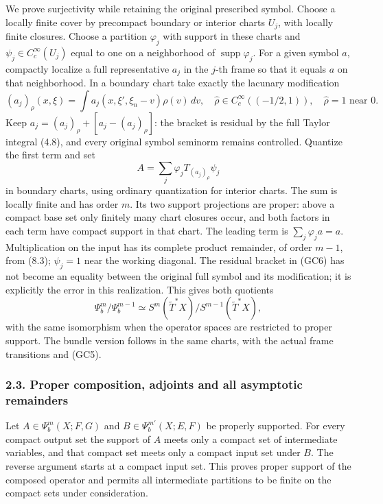\documentclass[
  11pt,
]{article}
\begin{document}
We prove surjectivity while retaining the original prescribed symbol.
Choose a locally finite cover by precompact boundary or interior charts
\(U_j\), with locally finite closures. Choose a partition \(\varphi_j\)
with support in these charts and \(\psi_j\in C_c^\infty(U_j)\) equal to
one on a neighborhood of \(\operatorname{supp}\varphi_j\). For a given
symbol \(a\), compactly localize a full representative \(a_j\) in the
\(j\)-th frame so that it equals \(a\) on that neighborhood. In a
boundary chart take exactly the lacunary modification \[
 (a_j)_\rho(x,\xi)=\int a_j(x,\xi',\xi_n-v)\rho(v)\,dv,
 \quad \widehat\rho\in C_c^\infty((-1/2,1)),\quad
 \widehat\rho=1\text{ near }0.
 \tag{GC6}
\] Keep \(a_j=(a_j)_\rho+[a_j-(a_j)_\rho]\): the bracket is residual by
the full Taylor integral (4.8), and every original symbol seminorm
remains controlled. Quantize the first term and set \[
 A=\sum_j\varphi_j T_{(a_j)_\rho}\psi_j
 \tag{GC7}
\] in boundary charts, using ordinary quantization for interior charts.
The sum is locally finite and has order \(m\). Its two support
projections are proper: above a compact base set only finitely many
chart closures occur, and both factors in each term have compact support
in that chart. The leading term is \(\sum_j\varphi_j a=a\).
Multiplication on the input has its complete product remainder, of order
\(m-1\), from (8.3); \(\psi_j=1\) near the working diagonal. The
residual bracket in (GC6) has not become an equality between the
original full symbol and its modification; it is explicitly the error in
this realization. This gives both quotients \[
 \Psi_b^m/\Psi_b^{m-1}\simeq
 S^m(\widetilde T^*X)/S^{m-1}(\widetilde T^*X),
 \tag{GC8}
\] with the same isomorphism when the operator spaces are restricted to
proper support. The bundle version follows in the same charts, with the
actual frame transitions and (GC5).

\subsubsection{2.3. Proper composition, adjoints and all asymptotic
remainders}\label{proper-composition-adjoints-and-all-asymptotic-remainders}

Let \(A\in\Psi_b^m(X;F,G)\) and \(B\in\Psi_b^{m'}(X;E,F)\) be properly
supported. For every compact output set the support of \(A\) meets only
a compact set of intermediate variables, and that compact set meets only
a compact input set under \(B\). The reverse argument starts at a
compact input set. This proves proper support of the composed operator
and permits all intermediate partitions to be finite on the compact sets
under consideration.
\end{document}

